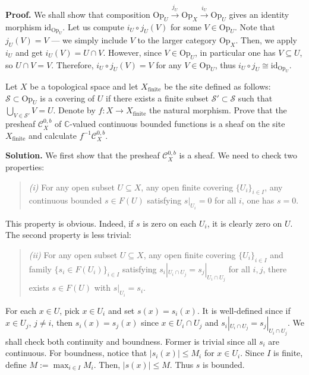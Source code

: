 \documentclass{category-template}
\begin{document}
\textbf{Proof.} We shall show that composition $\text{Op}_U \xrightarrow{j_U}
\text{Op}_X \xrightarrow{i_U} \text{Op}_U$ gives an identity morphism
$\text{id}_{\text{Op}_U}$. Let us compute $i_U \circ j_U(V)$ for some $V \in
\text{Op}_U$. Note that $j_U(V)=V$ --- we simply include $V$ to the larger
category $\text{Op}_X$. Then, we apply $i_U$ and get $i_U(V) = U \cap V$.
However, since $V \in \text{Op}_U$, in particular one has $V \subseteq U$, so $U
\cap V = V$. Therefore, $i_U \circ j_U(V) = V$ for any $V \in \text{Op}_U$, thus
$i_U \circ j_U \cong \text{id}_{\text{Op}_U}$.

\begin{problem}[Exercise 1.8]
    Let $X$ be a topological space and let $X_{\text{finite}}$ be the site
    defined as follows: $\mathcal{S} \subset \text{Op}_U$ is a covering of $U$
    if there exists a finite subset $\mathcal{S}' \subset \mathcal{S}$ such that
    $\bigcup_{V \in \mathcal{S}'}V = U$. Denote by $f: X \to X_{\text{finite}}$
    the natural morphism. Prove that the presheaf $\mathcal{C}_X^{0,b}$ of
    $\mathbb{C}$-valued continuous bounded functions is a sheaf on the site
    $X_{\text{finite}}$ and calculate $f^{-1}\mathcal{C}_X^{0,b}$. 
\end{problem}

\textbf{Solution.} We first show that the presheaf $\mathcal{C}_X^{0,b}$ is a
sheaf. We need to check two properties:
\begin{quote}
    \textit{(i)} For any open subset $U \subseteq X$, any open finite covering
    $\{U_i\}_{i \in I}$, any continuous bounded $s \in F(U)$ satisfying $s|_{U_i}=0$ for all $i$,
    one has $s=0$.
\end{quote}

This property is obvious. Indeed, if $s$ is zero on each $U_i$, it is clearly
zero on $U$. The second property is less trivial:
\begin{quote}
    \textit{(ii)} For any open subset $U \subseteq X$, any open finite covering 
    $\{U_i\}_{i \in I}$ and family $\{s_i \in F(U_i)\}_{i \in I}$ 
    satisfying $s_i|_{U_i \cap U_j} = s_j|_{U_i \cap U_j}$ for all $i,j$, there 
    exists $s \in F(U)$ with $s|_{U_i}=s_i$.
\end{quote}

For each $x \in U$, pick $x \in U_i$ and set $s(x) = s_i(x)$. It is well-defined
since if $x \in U_j$, $j \neq i$, then $s_i(x)=s_j(x)$ since $x \in U_i \cap
U_j$ and $s_i|_{U_i \cap U_j} = s_j|_{U_i \cap U_j}$. We shall check both
continuity and boundness. Former is trivial since all $s_i$ are continuous. For
boundness, notice that $|s_i(x)| \leq M_i$ for $x \in U_i$. Since $I$ is finite,
define $M := \max_{i \in I}M_i$. Then, $|s(x)| \leq M$. Thus $s$ is bounded.
\end{document}
